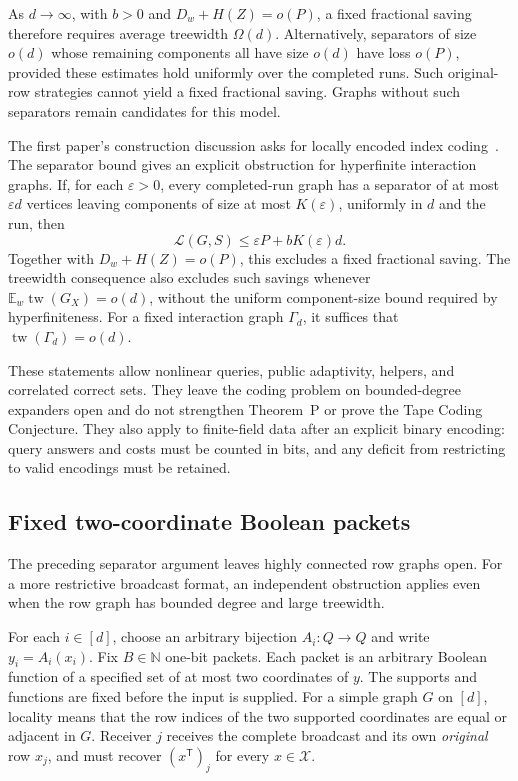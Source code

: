 As $d\to\infty$, with $b>0$ and $D_w+H(Z)=o(P)$, a fixed fractional saving
therefore requires average treewidth $\Omega(d)$.  Alternatively, separators
of size $o(d)$ whose remaining components all have size $o(d)$ have loss
$o(P)$, provided these estimates hold uniformly over the completed runs.
Such original-row strategies cannot yield a fixed fractional saving.
Graphs without such separators remain candidates for this model.

The first paper's construction discussion asks for locally encoded index
coding~\cite[section ``The construction side'']{FirstPaper2026}.
The separator bound gives an explicit obstruction for hyperfinite interaction
graphs.  If, for each $\varepsilon>0$,
every completed-run graph has a separator of at most $\varepsilon d$ vertices
leaving components of size at most $K(\varepsilon)$, uniformly in $d$ and the
run, then
\[
  \mathcal L(G,S)\le\varepsilon P+bK(\varepsilon)d.
\]
Together with $D_w+H(Z)=o(P)$, this excludes a fixed fractional saving.
The treewidth consequence also excludes such savings whenever
$\mathbb E_w\operatorname{tw}(G_X)=o(d)$, without the uniform component-size
bound required by hyperfiniteness.  For a fixed interaction graph $\Gamma_d$,
it suffices that $\operatorname{tw}(\Gamma_d)=o(d)$.

These statements allow nonlinear queries, public adaptivity, helpers, and
correlated correct sets.  They leave the coding problem on bounded-degree
expanders open and do not strengthen Theorem~P or prove the Tape Coding
Conjecture.  They also apply to finite-field data after an explicit binary
encoding: query answers and costs must be counted in bits, and any deficit
from restricting to valid encodings must be retained.

\subsection{Fixed two-coordinate Boolean packets}\label{subsec:local-xor}

The preceding separator argument leaves highly connected row graphs open.
For a more restrictive broadcast format, an independent obstruction applies
even when the row graph has bounded degree and large treewidth.

\begin{definition}\label{def:local-recoded-xor}
For each $i\in[d]$, choose an arbitrary bijection $A_i:Q\to Q$ and write
$y_i=A_i(x_i)$. Fix $B\in\mathbb N$ one-bit packets. Each packet is an
arbitrary Boolean function of a specified set of at most two coordinates of
$y$. The supports and functions are fixed before the input is supplied.
For a simple graph $G$ on $[d]$, locality means that the row indices of the
two supported coordinates are equal or adjacent in $G$. Receiver $j$
receives the complete broadcast and its own \emph{original} row $x_j$, and
must recover $(x^{\mathsf T})_j$ for every $x\in\mathcal X$.
\end{definition}

